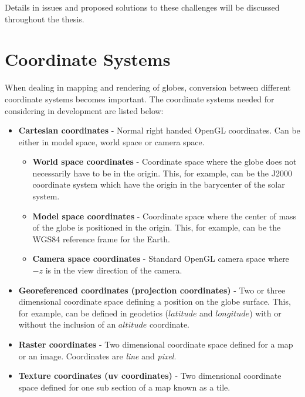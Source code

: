 Details in issues and proposed solutions to these challenges will be discussed throughout the thesis.

\section{Coordinate Systems}

When dealing in mapping and rendering of globes, conversion between different coordinate systems becomes important. The coordinate systems needed for considering in development are listed below:

\begin{itemize}
\item \textbf{Cartesian coordinates} - Normal right handed OpenGL coordinates. Can be either in model space, world space or camera space.

\begin{itemize}
\item \textbf{World space coordinates} - Coordinate space where the globe does not necessarily have to be in the origin. This, for example, can be the J2000 coordinate system which have the origin in the barycenter of the solar system.
\item \textbf{Model space coordinates} - Coordinate space where the center of mass of the globe is positioned in the origin. This, for example, can be the WGS84 reference frame for the Earth.
\item \textbf{Camera space coordinates} - Standard OpenGL camera space where $-z$ is in the view direction of the camera.
\end{itemize}

\item \textbf{Georeferenced coordinates (projection coordinates)} - Two or three dimensional coordinate space defining a position on the globe surface. This, for example, can be defined in geodetics ($latitude$ and $longitude$) with or without the inclusion of an $altitude$ coordinate.

\item \textbf{Raster coordinates} - Two dimensional coordinate space defined for a map or an image. Coordinates are \emph{line} and \emph{pixel}.

\item \textbf{Texture coordinates (uv coordinates)} - Two dimensional coordinate space defined for one sub section of a map known as a tile.

\end{itemize}
